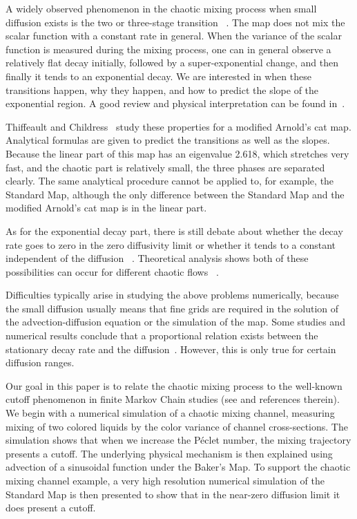\documentclass[twocolumn,10pt]{asme2e}
\begin{document}
A widely observed phenomenon in the chaotic mixing process when small
diffusion exists is the two or three-stage transition~
\cite{Thiffeault2003-13, Fereday2002, Mezic2005}. The
map does not mix the scalar function with a constant rate in
general. When the variance of the scalar function is measured during
the mixing process, one can in general observe a relatively flat decay
initially, followed by a super-exponential change, and then finally it
tends to an exponential decay. We are interested in when these
transitions happen, why they happen, and how to predict the slope of
the exponential region. A good review and physical interpretation can
be found in~\cite{Thiffeault2004}.

Thiffeault and Childress~\cite{Thiffeault2003-13} study these
properties for a modified Arnold's cat map. Analytical formulas are
given to predict the transitions as well as the slopes. Because the
linear part of this map has an eigenvalue 2.618, which stretches very fast, 
and the chaotic part is relatively small, the three phases are
separated clearly. The same analytical procedure cannot be applied to,
for example, the Standard Map, although the only difference between the
Standard Map and the modified Arnold's cat map is in the linear part.

As for the exponential decay part, there is still debate about whether
the decay rate goes to zero in the zero diffusivity limit or whether
it tends to a constant independent of the diffusion~
\cite{Thiffeault2004, Tsang2005}. Theoretical analysis shows both of
these possibilities can occur for different chaotic flows
~\cite{Haynes2005}.

Difficulties typically arise in studying the above problems
numerically, because the small diffusion usually means that fine grids
are required in the solution of the advection-diffusion equation or
the simulation of the map. Some studies and numerical results conclude
that a proportional relation exists between the stationary decay rate
and the diffusion~\cite{Cerbelli2003}. However, this is only true for
certain diffusion ranges.

Our goal in this paper is to relate the chaotic mixing process to the
well-known cutoff phenomenon in finite Markov Chain studies
(see\cite{Diaconis2005} and references therein). We begin with a
numerical simulation of a chaotic mixing channel, measuring mixing of
two colored liquids by the color variance of channel
cross-sections. The simulation shows that when we increase the
P\'{e}clet number, the mixing trajectory presents a cutoff. The
underlying physical mechanism is then explained using advection of a
sinusoidal function under the Baker's Map. To support the chaotic
mixing channel example, a very high resolution numerical simulation of
the Standard Map is then presented to show that in the near-zero
diffusion limit it does present a cutoff.
\end{document}
